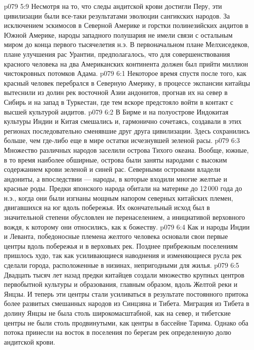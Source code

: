 \vs p079 5:9 Несмотря на то, что следы андитской крови достигли Перу, эти цивилизации были все\hyp{}таки результатами эволюции сангикских народов. За исключением эскимосов в Северной Америке и горстки полинезийских андитов в Южной Америке, народы западного полушария не имели связи с остальным миром до конца первого тысячелетия н.э. В первоначальном плане Мелхиседеков, плане улучшения рас Урантии, предполагалось, что для совершенствования красного человека на два Американских континента должен был прийти миллион чистокровных потомков Адама.
\vs p079 6:1 Некоторое время спустя после того, как красный человек перебрался в Северную Америку, в процессе экспансии китайцы вытеснили из долин рек восточной Азии андонитов, прогнав их на север в Сибирь и на запад в Туркестан, где тем вскоре предстояло войти в контакт с высшей культурой андитов.
\vs p079 6:2 В Бирме и на полуострове Индокитая культуры Индии и Китая смешались и, гармонично сочетаясь, создавали в этих регионах последовательно сменявшие друг друга цивилизации. Здесь сохранились больше, чем где\hyp{}либо еще в мире остатки исчезнувшей зеленой расы.
\vs p079 6:3 Множество различных народов заселили острова Тихого океана. Вообще, южные, в то время наиболее обширные, острова были заняты народами с высоким содержанием крови зеленой и синей рас. Северными островами владели андониты, а впоследствии --- народы, в которые входили многие желтые и красные роды. Предки японского народа обитали на материке до 12\,000 года до н.э., когда они были изгнаны мощным напором северных китайских племен, двигавшихся на юг вдоль побережья. Их окончательный исход был в значительной степени обусловлен не перенаселением, а инициативой верховного вождя, к которому они относились, как к божеству.
\vs p079 6:4 Как и народы Индии и Леванта, победоносные племена желтого человека основали свои первые центры вдоль побережья и в верховьях рек. Позднее прибрежным поселениям пришлось худо, так как усиливающиеся наводнения и изменяющиеся русла рек сделали города, расположенные в низинах, непригодными для жилья.
\vs p079 6:5 Двадцать тысяч лет назад предки китайцев создали множество крупных центров первобытной культуры и образования, главным образом, вдоль Желтой реки и Янцзы. И теперь эти центры стали усиливаться в результате постоянного притока более развитых смешанных народов из Синцзяна и Тибета. Миграция из Тибета в долину Янцзы не была столь широкомасштабной, как на север, и тибетские центры не были столь продвинутыми, как центры в бассейне Тарима. Однако оба потока принесли на восток в поселения по берегам рек определенную долю андитской крови.
